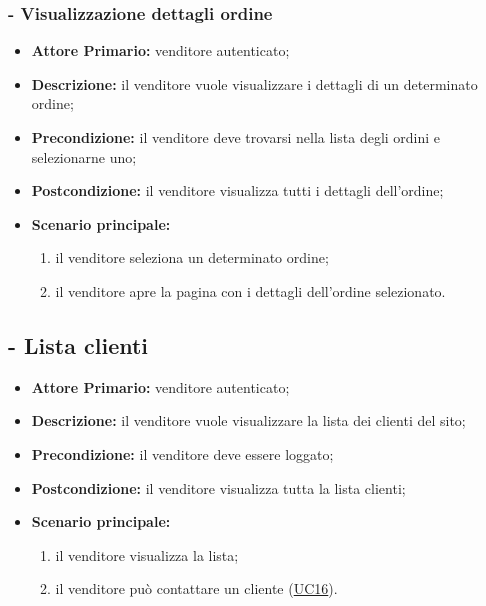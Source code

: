 \subsubsection{- Visualizzazione dettagli ordine}
\begin{itemize}
    \item \textbf{Attore Primario:} venditore autenticato;
    \item \textbf{Descrizione:} il venditore vuole visualizzare i dettagli di un determinato ordine;
    \item \textbf{Precondizione:} il venditore deve trovarsi nella lista degli ordini e selezionarne uno;
    \item \textbf{Postcondizione:} il venditore visualizza tutti i dettagli dell'ordine;
    \item \textbf{Scenario principale:}
    \begin{enumerate}
        \item il venditore seleziona un determinato ordine;
        \item il venditore apre la pagina con i dettagli dell'ordine selezionato.
    \end{enumerate}
\end{itemize}

\stepUserCase
\subsection{ - Lista clienti}
\begin{itemize}
    \item \textbf{Attore Primario:} venditore autenticato;
    \item \textbf{Descrizione:} il venditore vuole visualizzare la lista dei clienti del sito;
    \item \textbf{Precondizione:} il venditore deve essere loggato;
    \item \textbf{Postcondizione:} il venditore visualizza tutta la lista clienti;
    \item \textbf{Scenario principale:}
    \begin{enumerate}
        \item il venditore visualizza la lista;
        \item il venditore può contattare un cliente (\hyperref[UC16]{UC16}).
    \end{enumerate}
\end{itemize}

\stepUserCase

